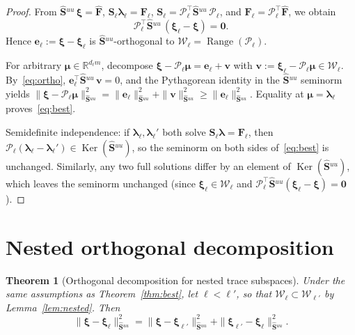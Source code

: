 \documentclass[11pt,a4paper]{article}
\newtheorem{theorem}{Theorem}[section]
\theoremstyle{definition}
\newcommand{\R}{\mathbb{R}}
\newcommand{\trac}{\bm{\lambda}}
\newcommand{\Schur}{\mathbf{S}}
\newcommand{\Shatuu}{\widehat{\Schur}{}^{uu}}
\newcommand{\Fhat}{\widehat{\bm{F}}}
\newcommand{\zero}{\bm{0}}
\newcommand{\Range}{\operatorname{Range}}
\newcommand{\Ker}{\operatorname{Ker}}
\newcommand{\Wspace}{\mathcal{W}}
\newcommand{\Pcal}{\mathcal{P}}
\begin{document}
\begin{proof}
  From $\Shatuu\,\bm{\xi} = \Fhat$,
  $\Schur_\ell \trac_\ell = \bm{F}_\ell$,
  $\Schur_\ell = \Pcal_\ell^\top \Shatuu\,\Pcal_\ell$, and
  $\bm{F}_\ell = \Pcal_\ell^\top \Fhat$, we obtain
  \begin{equation}\label{eq:ortho}
    \Pcal_\ell^\top \Shatuu\,(\bm{\xi}_\ell - \bm{\xi}) = \zero.
  \end{equation}
  Hence $\bm{e}_\ell := \bm{\xi} - \bm{\xi}_\ell$ is
  $\Shatuu$-orthogonal to $\Wspace_\ell = \Range(\Pcal_\ell)$.

  For arbitrary $\bm{\mu}\in\R^{d_\ell m}$, decompose
  $\bm{\xi} - \Pcal_\ell\bm{\mu}
   = \bm{e}_\ell + \bm{v}$
  with $\bm{v} := \bm{\xi}_\ell - \Pcal_\ell\bm{\mu}
  \in \Wspace_\ell$.
  By~\eqref{eq:ortho}, $\bm{e}_\ell^\top \Shatuu\,\bm{v} = 0$, and the
  Pythagorean identity in the $\Shatuu$ seminorm yields
  $\|\bm{\xi} - \Pcal_\ell\bm{\mu}\|_{\Shatuu}^2
   = \|\bm{e}_\ell\|_{\Shatuu}^2 + \|\bm{v}\|_{\Shatuu}^2
   \ge \|\bm{e}_\ell\|_{\Shatuu}^2$.
  Equality at $\bm{\mu} = \trac_\ell$ proves~\eqref{eq:best}.

  Semidefinite independence: if $\trac_\ell,\trac_\ell'$ both solve
  $\Schur_\ell\trac = \bm{F}_\ell$, then
  $\Pcal_\ell(\trac_\ell-\trac_\ell') \in \Ker(\Shatuu)$,
  so the seminorm on both sides of~\eqref{eq:best} is unchanged.
  Similarly, any two full solutions differ by an element of
  $\Ker(\Shatuu)$, which leaves the seminorm unchanged
  (since $\bm{\xi}_\ell \in \Wspace_\ell$ and
   $\Pcal_\ell^\top\Shatuu(\bm{\xi}_\ell-\bm{\xi})=\zero$).
\end{proof}

\section{Nested orthogonal decomposition}

\begin{theorem}[Orthogonal decomposition for nested trace subspaces]\label{thm:nested}
  Under the same assumptions as Theorem~\ref{thm:best}, let
  $\ell < \ell'$, so that $\Wspace_\ell \subset \Wspace_{\ell'}$ by
  Lemma~\ref{lem:nested}.  Then
  \begin{equation}\label{eq:nested}
    \|\bm{\xi} - \bm{\xi}_\ell\|_{\Shatuu}^2
    = \|\bm{\xi} - \bm{\xi}_{\ell'}\|_{\Shatuu}^2
      + \|\bm{\xi}_{\ell'} - \bm{\xi}_\ell\|_{\Shatuu}^2.
  \end{equation}
\end{theorem}
\end{document}
